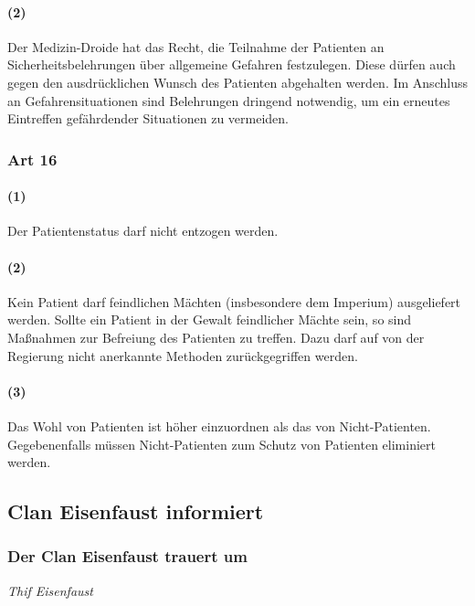 \paragraph{(2)} Der Medizin-Droide hat das Recht, die Teilnahme der Patienten an Sicherheitsbelehrungen über allgemeine Gefahren festzulegen. Diese dürfen auch gegen den ausdrücklichen Wunsch des Patienten abgehalten werden. Im Anschluss an Gefahrensituationen sind Belehrungen dringend notwendig, um ein erneutes Eintreffen gefährdender Situationen zu vermeiden.

\subsubsection{Art 16}
\paragraph{(1)} Der Patientenstatus darf nicht entzogen werden.
\paragraph{(2)} Kein Patient darf feindlichen Mächten (insbesondere dem Imperium) ausgeliefert werden. Sollte ein Patient in der Gewalt feindlicher Mächte sein, so sind Maßnahmen zur Befreiung des Patienten zu treffen. Dazu darf auf von der Regierung nicht anerkannte Methoden zurückgegriffen werden.
\paragraph{(3)} Das Wohl von Patienten ist höher einzuordnen als das von Nicht-Patienten. Gegebenenfalls müssen Nicht-Patienten zum Schutz von Patienten eliminiert werden.


\subsection{Clan Eisenfaust informiert}
\subsubsection{Der Clan Eisenfaust trauert um}

\begin{center}
  \textit{Thif Eisenfaust}
\end{center}

